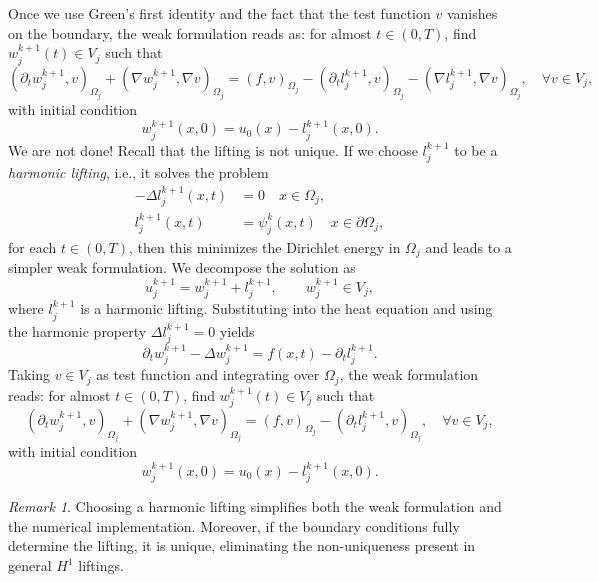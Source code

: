 \documentclass[a4paper, 11pt]{article}
\theoremstyle{remark}
\newtheorem{remark}[equation]{Remark}
\begin{document}
Once we use Green's first identity and the fact that the test function $v$ vanishes on the boundary, the weak formulation reads as: for almost $t\in (0, T)$, find $w_{j}^{k+1}(t)\in V_{j}$ such that
\begin{equation*}
    \left(\partial_{t} w_{j}^{k+1}, v\right)_{\Omega_{j}} + \left(\nabla w_{j}^{k+1}, \nabla v\right)_{\Omega_{j}} = \left(f, v\right)_{\Omega_{j}} - \left(\partial_{t} l_{j}^{k+1}, v\right)_{\Omega_{j}} - \left(\nabla l_{j}^{k+1}, \nabla v\right)_{\Omega_{j}}, \quad\forall v\in V_{j},
\end{equation*}
with initial condition
\begin{equation*}
    w^{k+1}_{j}(x, 0) = u_{0}(x) - l_{j}^{k+1}(x, 0).
\end{equation*}
We are not done! Recall that the lifting is not unique. If we choose $l_j^{k+1}$ to be a \emph{harmonic lifting}, i.e., it solves the problem 
\begin{align*}
    -\Delta l_j^{k+1}(x, t) &= 0 \quad x\in\Omega_j,\\
    l_j^{k+1}(x, t) &= \psi_{j}^{k}(x, t) \quad x\in \partial\Omega_j,
\end{align*}
for each $t\in (0, T)$, then this minimizes the Dirichlet energy in $\Omega_j$ and leads to a simpler weak formulation. We decompose the solution as
\begin{equation*}
    u_{j}^{k+1} = w^{k+1}_{j} + l_{j}^{k+1}, \qquad w^{k+1}_{j}\in V_{j},
\end{equation*}
where $l_j^{k+1} $ is a harmonic lifting. Substituting into the heat equation and using the harmonic property $\Delta l_j^{k+1} = 0$ yields
\begin{equation*}
    \partial_t w_j^{k+1} - \Delta w_j^{k+1} = f(x, t) - \partial_t l_j^{k+1}.
\end{equation*}
Taking $v \in V_j$ as test function and integrating over $\Omega_j$, the weak formulation reads: for almost $t \in (0,T)$, find $w_j^{k+1}(t) \in V_j$ such that
\begin{equation*}
    \left(\partial_t w_j^{k+1}, v\right)_{\Omega_j} + \left(\nabla w_j^{k+1}, \nabla v\right)_{\Omega_j} = (f, v)_{\Omega_j} - \left(\partial_t l_j^{k+1}, v\right)_{\Omega_j}, \quad \forall v \in V_j,
\end{equation*}
with initial condition
\begin{equation*}
    w_j^{k+1}(x,0) = u_0(x) - l_j^{k+1}(x,0).
\end{equation*}
\begin{remark}
    Choosing a harmonic lifting simplifies both the weak formulation and the numerical implementation. Moreover, if the boundary conditions fully determine the lifting, it is unique, eliminating the non-uniqueness present in general $H^1$ liftings.
\end{remark} 
\end{document}

